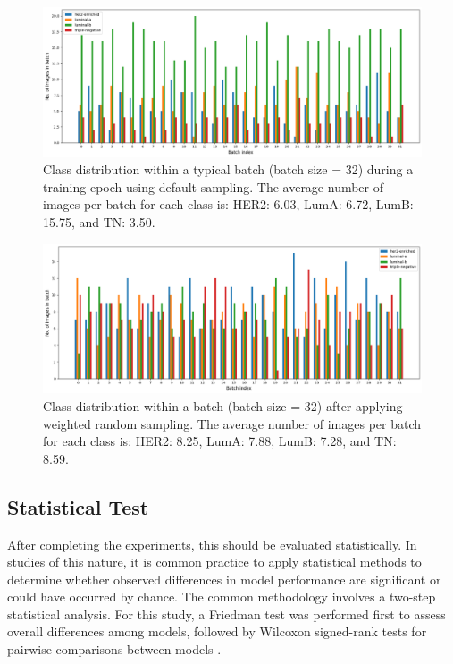 \documentclass[a4paper,10pt]{book}
\begin{document}
\begin{figure}[h!]
    \centering
    \includegraphics[width=.8\linewidth]{reports//assets/sampler.png}
    \caption[Batch Sampling (Default)]{Class distribution within a typical batch (batch size = 32) during a training epoch using default sampling. The average number of images per batch for each class is: HER2: 6.03, LumA: 6.72, LumB: 15.75, and TN: 3.50.}
    \label{fig:batch_sampling}
\end{figure}

\begin{figure}[ht!]
    \centering
    \includegraphics[width=0.8\linewidth]{reports//assets/sampler2.png}
    \caption[Batch Sampling (Weighted)]{Class distribution within a batch (batch size = 32) after applying weighted random sampling. The average number of images per batch for each class is: HER2: 8.25, LumA: 7.88, LumB: 7.28, and TN: 8.59.}
    \label{fig:batch_sampling_weighted}
\end{figure}


\subsection{Statistical Test}

After completing the experiments, this should be evaluated statistically. In studies of this nature, it is common practice to apply statistical methods to determine whether observed differences in model performance are significant or could have occurred by chance. The common methodology involves a two-step statistical analysis. For this study, a Friedman test was performed first to assess overall differences among models, followed by Wilcoxon signed-rank tests for pairwise comparisons between models \cite{demsar_statistical_2006}.
\end{document}
